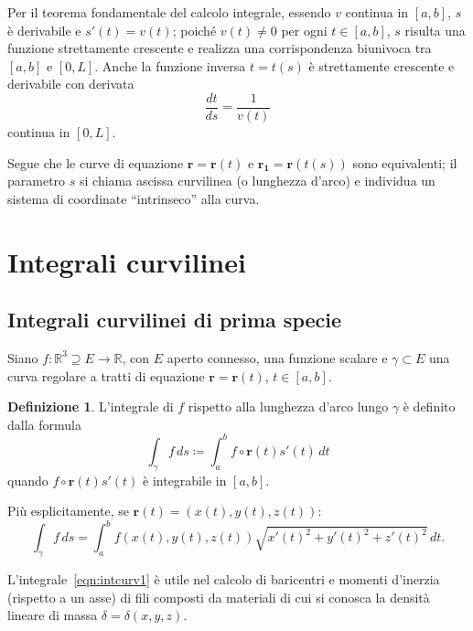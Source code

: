 \documentclass[a4paper]{book}
\numberwithin{equation}{section}
\theoremstyle{plain}
\theoremstyle{definition}
\newtheorem{defn}{Definizione}[section]
\theoremstyle{remark}
\renewcommand{\vec}{\boldsymbol}
\theoremstyle{example}
\begin{document}
Per il teorema fondamentale del calcolo integrale, essendo $v$ continua in $[a, b]$, $s$ è derivabile e $s'(t) = v(t)$; poiché $v(t) \ne 0$ per ogni $t \in [a, b]$, $s$ risulta una funzione strettamente crescente e realizza una corrispondenza biunivoca tra $[a, b]$ e $[0, L]$. Anche la funzione inversa $t = t(s)$ è strettamente crescente e derivabile con derivata
	\begin{equation*}
	\frac{dt}{ds} = \frac{1}{v(t)}
	\end{equation*}	
continua in $[0, L]$. 

Segue che le curve di equazione $\vec{r} = \vec{r}(t)$ e $\vec{r_1} = \vec{r}(t(s))$ sono equivalenti; il parametro $s$ si chiama ascissa curvilinea (o lunghezza d'arco) e individua un sistema di coordinate ``intrinseco'' alla curva.

\section{Integrali curvilinei}
\subsection{Integrali curvilinei di prima specie}

Siano $f \colon \mathbb{R}^3 \supseteq E \to \mathbb{R}$, con $E$ aperto connesso, una funzione scalare e $\gamma \subset E$ una curva regolare a tratti di equazione $\vec{r} = \vec{r}(t)$, $t \in [a, b]$.

	\begin{defn}
	L'integrale di $f$ rispetto alla lunghezza d'arco lungo $\gamma$ è definito dalla formula
		\begin{equation}
		\label{eqn:intcurv1}
		\int_{\gamma}f\, ds \coloneqq \int_a^b f \circ \vec{r}(t)s'(t)\, dt
		\end{equation}
	quando $f \circ \vec{r}(t)s'(t)$ è integrabile in $[a, b]$.
	\end{defn}

Più esplicitamente, se $\vec{r}(t) = (x(t), y(t), z(t))$:
	\begin{equation*}
	\int_{\gamma} f \, ds = \int_a^b f(x(t), y(t), z(t)) \sqrt{x'(t)^2 + y'(t)^2 + z'(t)^2} \, dt.
	\end{equation*}

L'integrale~\eqref{eqn:intcurv1} è utile nel calcolo di baricentri e momenti d'inerzia (rispetto a un asse) di fili composti da materiali di cui si conosca la densità lineare di massa $\delta = \delta(x, y, z)$. 
\end{document}
